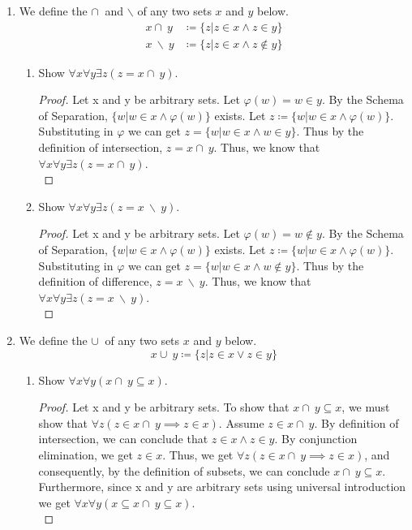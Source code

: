 \documentclass{article}
\newcommand{\union}{\cup\:}
\newcommand{\intersect}{\cap\:}
\newcommand{\defeq}{\coloneqq}
\begin{document}
\begin{enumerate}
\begin{enumerate}
\begin{proof}
        \end{proof}
    \end{enumerate}
    \item We define the $\intersect$ and $\backslash$ of any two sets $x$ and $y$ below.
    \begin{align*}
      x \intersect y &\defeq \{z | z \in x \land z \in y\} \\
      x \:\backslash\: y &\defeq \{z | z \in x \land z \not \in y\}
    \end{align*}
    \begin{enumerate}
      \item
        Show $\forall x \forall y \exists z (z = x \intersect y)$.
        \begin{proof}
            Let x and y be arbitrary sets. Let $\varphi(w)=w\in y$. By the Schema of Separation, $\{w|w\in x \land \varphi(w)\}$ exists. Let $z \defeq \{w|w\in x \land \varphi(w)\}$. Substituting in $\varphi$ we can get $z = \{w|w\in x \land w \in y\}$. Thus by the definition of intersection, $z = x\intersect y$. Thus, we know that $\forall x \forall y \exists z (z = x \intersect y)$.\\
        \end{proof}
      \item
        Show $\forall x \forall y \exists z (z = x \:\backslash\: y)$.
        \begin{proof}
            Let x and y be arbitrary sets. Let $\varphi(w)=w\notin y$. By the Schema of Separation, $\{w|w\in x \land \varphi(w)\}$ exists. Let $z \defeq \{w|w\in x \land \varphi(w)\}$. Substituting in $\varphi$ we can get $z = \{w|w\in x \land w \notin y\}$. Thus by the definition of difference, $z = x\:\backslash\: y$. Thus, we know that $\forall x \forall y \exists z (z = x \:\backslash\: y)$.\\
        \end{proof}
    \end{enumerate}
    \item We define the $\union$ of any two sets $x$ and $y$ below.
    \begin{equation*}
      x \union y \defeq \{z | z \in x \lor z \in y\}
    \end{equation*}
    \begin{enumerate}
      \item Show $\forall x \forall y (x \intersect y \subseteq x)$.
        \begin{proof}
        Let x and y be arbitrary sets. To show that $x \intersect y \subseteq x$, we must show that $\forall z(z \in x \intersect y \implies z \in x)$. Assume $z \in x \intersect y$. By definition of intersection, we can conclude that $z \in x \land z \in y$. By conjunction elimination, we get $z \in x$. Thus, we get $\forall z(z \in x \intersect y \implies z \in x)$, and consequently, by the definition of subsets, we can conclude $x \intersect y \subseteq x$. Furthermore, since x and y are arbitrary sets using universal introduction we get $\forall x \forall y (x \subseteq x \intersect y \subseteq x)$.\\

\end{proof}
\end{enumerate}
\end{enumerate}
\end{document}
